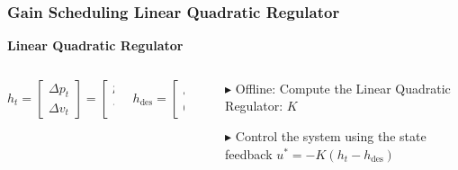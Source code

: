 \documentclass[9pt, aspectratio=169]{beamer}
\begin{document}
\begin{frame}
\frametitle{Gain Scheduling Linear Quadratic Regulator}
\centering
\textcolor{emph@Thesis}{\textbf{\small{Linear Quadratic Regulator}}} 
\vspace{0.2cm}
\begin{columns}
\begin{column}{0.4\textwidth}
\centering

\begin{columns}
\begin{column}{0.6\textwidth}
\centering
\begin{block}{}
\begin{equation*}
    h_t =
    \begin{bmatrix}
        \Delta p_t  \\
        \Delta v_t
    \end{bmatrix}
	=
    \begin{bmatrix}
        p_{k,t} - p_{r,t} \\
        v_{k,t} - v_{r,t}
    \end{bmatrix}
\end{equation*}

\end{block}
\end{column}

\begin{column}{0.3\textwidth}
\centering
\begin{block}{}
\begin{equation*}
    h_{\text{des}} =
    \begin{bmatrix}
        d_{\text{des}} \\
        0
    \end{bmatrix}
\end{equation*}
\end{block}
\end{column}
\end{columns}

\end{column}

\begin{column}{0.6\textwidth}
\centering
\begin{itemize}
	\footnotesize
	\item[$\blacktriangleright$] Offline: Compute the Linear Quadratic Regulator: $K$
	\item[$\blacktriangleright$] Control the system using the state feedback $u^* = - K (h_t - h_{\text{des}}) $
\end{itemize}
\end{column}
\end{columns}


\end{frame}
\end{document}
